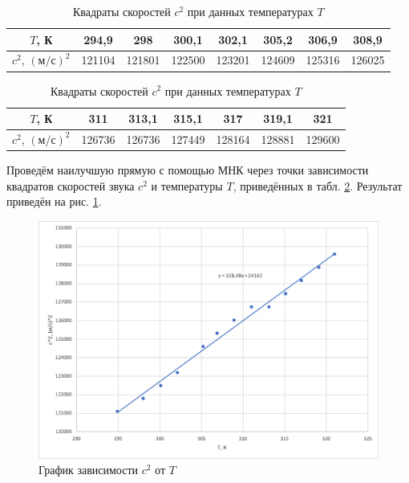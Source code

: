 \documentclass[a4paper, 12pt]{article}
\begin{document}
\begin{enumerate}
        \begin{table}[ht]
            \centering
            \begin{tabular}{|c|c|c|c|c|c|c|c|}
                \hline
                $T$, К & 294,9 & 298 & 300,1 & 302,1 & 305,2 & 306,9 & 308,9 \\ 
                \hline
                $c^2$, $(\text{м/с})^2$ & 121104 & 121801 & 122500 & 123201 & 124609 & 125316 & 126025 \\
                \hline
            \end{tabular}
            \vspace{0.5cm}
            \begin{tabular}{|c|c|c|c|c|c|c|}
                \hline 
                $T$, К & 311 & 313,1 & 315,1 & 317 & 319,1 & 321 \\
                \hline 
                $c^2$, $(\text{м/с})^2$ & 126736 & 126736 & 127449 & 128164 & 128881 & 129600 \\
                \hline
            \end{tabular}
            \caption{Квадраты скоростей $c^2$ при данных температурах $T$}
            \label{table3}
        \end{table}
        
        Проведём наилучшую прямую с помощью МНК через точки зависимости квадратов скоростей звука $c^2$ и температуры $T$, приведённых в табл. \ref{table3}. Результат приведён на рис. \ref{pic3}.
        
        \begin{figure}[ht]
            \centering
            \includegraphics[width=0.8\linewidth]{14.png}
            \caption{График зависимости $c^2$ от $T$}
            \label{pic3}
        \end{figure}
        

\end{enumerate}
\end{document}
